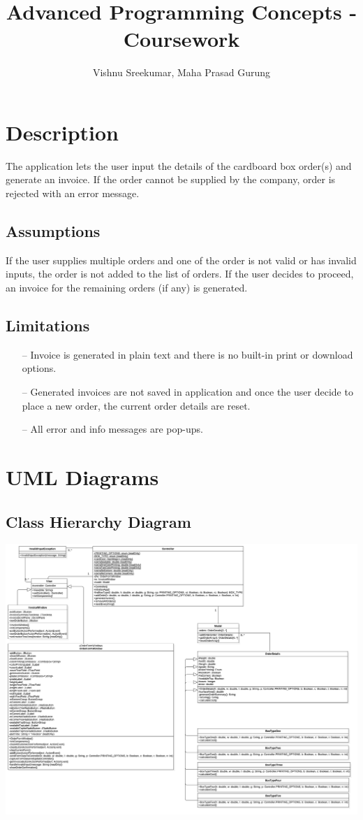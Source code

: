 \documentclass[12pt]{article}
\title{Advanced Programming Concepts - Coursework}
\author{Vishnu Sreekumar, Maha Prasad Gurung}
\date{} %
\begin{document}
\maketitle
\tableofcontents
\newpage

\section{Description}
The application lets the user input the details of the cardboard box order(s) and generate an invoice. If the order cannot be supplied by the company, order is rejected with an error message.

\subsection{Assumptions}
If the user supplies multiple orders and one of the order is not valid or has invalid inputs, the order is not added to the list of orders. If the user decides to proceed, an invoice for the remaining orders (if any) is generated.

\subsection{Limitations}
\begin{enumerate}
	\item[--] Invoice is generated in plain text and there is no built-in print or download options. 
	\item [--] Generated invoices are not saved in application and once the user decide to place a new order, the current order details are reset.
	\item[--] All error and info messages are pop-ups.
\end{enumerate}
\newpage
\section{UML Diagrams}
\subsection{Class Hierarchy Diagram}
\includegraphics[scale=0.13]{./diagrams/ClassHierarchyDiagram.jpg}
\end{document}
